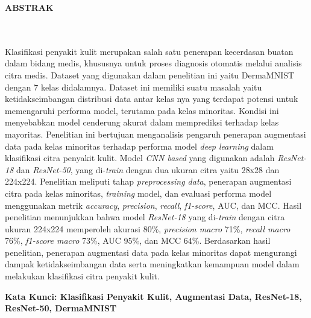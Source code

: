 \clearpage
{}%
\thispagestyle{fancy}

\begin{center}
	\large \bfseries \MakeUppercase{Abstrak}\\
	\normalsize \normalfont {\thetitle}\\
	\normalsize \normalfont {\theauthor}\\
	\bigskip
	
	\normalsize \normalfont \justifying \singlespacing
	Klasifikasi penyakit kulit merupakan salah satu penerapan 
	kecerdasan buatan dalam bidang medis, khususnya untuk proses 
	diagnosis otomatis melalui analisis citra medis. Dataset yang 
	digunakan dalam penelitian ini yaitu DermaMNIST dengan 7 kelas 
	didalamnya. Dataset ini 
	memiliki suatu masalah yaitu ketidakseimbangan distribusi data 
	antar kelas nya yang terdapat potensi untuk memengaruhi performa 
	model, terutama pada kelas minoritas. Kondisi ini menyebabkan 
	model cenderung akurat dalam memprediksi terhadap kelas mayoritas. 
	Penelitian ini bertujuan menganalisis pengaruh penerapan augmentasi 
	data pada kelas minoritas terhadap performa model \textit{deep learning} 
	dalam klasifikasi citra penyakit kulit. Model \textit{CNN based} 
	yang digunakan adalah \textit{ResNet-18} dan \textit{ResNet-50}, yang 
	di-\textit{train} dengan dua ukuran citra yaitu 28x28 dan 224x224. 
	Penelitian meliputi tahap \textit{preprocessing data}, penerapan 
	augmentasi citra pada kelas minoritas, \textit{training} model, 
	dan evaluasi performa model menggunakan metrik \textit{accuracy}, 
	\textit{precision}, \textit{recall}, \textit{f1-score}, AUC, dan 
	MCC. Hasil penelitian menunjukkan bahwa model \textit{ResNet-18} 
	yang di-\textit{train} dengan citra ukuran 224x224 memperoleh 
	akurasi 80\%, \textit{precision macro} 71\%, \textit{recall macro} 
	76\%, \textit{f1-score macro} 73\%, AUC 95\%, dan MCC 64\%. 
	Berdasarkan hasil penelitian, penerapan augmentasi data pada 
	kelas minoritas dapat mengurangi dampak ketidakseimbangan data 
	serta meningkatkan kemampuan model dalam melakukan klasifikasi 
	citra penyakit kulit.
	

    \vspace{20pt}
	\raggedright \textbf{Kata Kunci: Klasifikasi Penyakit Kulit, Augmentasi Data, ResNet-18, ResNet-50, DermaMNIST}
	
	\vfill
	
\end{center}
\clearpage